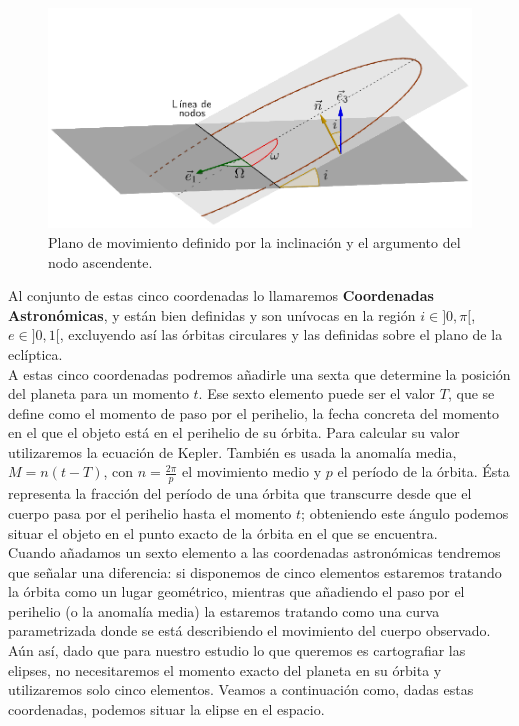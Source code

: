 \documentclass[11pt]{book}
\begin{document}
\begin{figure}[H]
\centering
\includegraphics[scale=0.375]{images/omega_i_5.png}
\caption{Plano de movimiento definido por la inclinación y el argumento del nodo ascendente.}
\label{fig:omega_i}
\end{figure}

Al conjunto de estas cinco coordenadas lo llamaremos \textbf{Coordenadas Astronómicas}, y están bien definidas y son unívocas en la región $i\in]0,\pi[$, $e\in]0,1[$, excluyendo así las órbitas circulares y las definidas sobre el plano de la eclíptica.\\


A estas cinco coordenadas podremos añadirle una sexta que determine la posición del planeta para un momento $t$. Ese sexto elemento puede ser el valor $T$, que se define como el momento de paso por el perihelio, la fecha concreta del momento en el que el objeto está en el perihelio de su órbita. Para calcular su valor utilizaremos la ecuación de Kepler. También es usada la anomalía media, $M=n(t-T)$, con $n=\frac{2\pi}{p}$ el movimiento medio y $p$ el período de la órbita. Ésta representa la fracción del período de una órbita que transcurre desde que el cuerpo pasa por el perihelio hasta el momento $t$; obteniendo este ángulo podemos situar el objeto en el punto exacto de la órbita en el que se encuentra.\\

Cuando añadamos un sexto elemento a las coordenadas astronómicas tendremos que señalar una diferencia: si disponemos de cinco elementos estaremos tratando la órbita como un lugar geométrico, mientras que añadiendo el paso por el perihelio (o la anomalía media) la estaremos tratando como una curva parametrizada donde se está describiendo el movimiento del cuerpo observado. Aún así, dado que para nuestro estudio lo que queremos es cartografiar las elipses, no necesitaremos el momento exacto del planeta en su órbita y utilizaremos solo cinco elementos. Veamos a continuación como, dadas estas coordenadas, podemos situar la elipse en el espacio.\\
\end{document}
